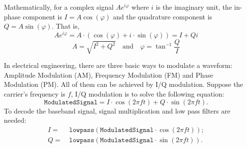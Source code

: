 Mathematically, for a complex signal $Ae^{i \varphi }$ where $i$ is the imaginary unit, the in-phase component is $I = A\cos(\varphi)$ and the quadrature component is $Q = A\sin(\varphi)$. That is,
\begin{displaymath}
	Ae^{i \varphi } = A \cdot (\cos(\varphi) + i \cdot \sin(\varphi)) = I + Qi
\end{displaymath}
\begin{displaymath}
 A = \sqrt{I^2 + Q^2}  \quad \text{and} \quad \varphi = \tan^{-1}\frac{Q}{I}
\end{displaymath}

In electrical engineering, there are three basic ways to modulate a waveform: Amplitude Modulation (AM), Frequency Modulation (FM) and Phase Modulation (PM). All of them can be achieved by I/Q modulation. Suppose the carrier's frequency is $f$, I/Q modulation is to solve the following equation:
\begin{displaymath}
\texttt{ModulatedSignal} = I \cdot \cos(2 \pi f t) + Q \cdot \sin(2 \pi f t) .
\end{displaymath}
To decode the baseband signal, signal multiplication and low pass filters are needed:
\begin{align*}
I =~&\texttt{lowpass} (\texttt{ModulatedSignal}  \cdot  \cos(2 \pi f t) ) ;\\        
Q=~&\texttt{lowpass} (\texttt{ModulatedSignal}  \cdot \sin(2 \pi f t) ) .
\end{align*}

